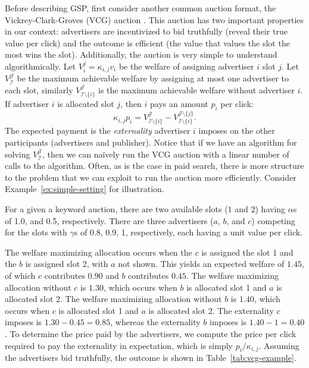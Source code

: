 \documentclass[prodmode,acmtist]{acmsmall} %
\begin{document}
Before describing GSP, first consider another common auction format, the Vickrey-Clark-Groves (VCG) auction \cite{Vickrey:1961ys}.
This auction has two important properties in our context: advertisers are incentivized to bid truthfully (reveal their true value per click) and the outcome is efficient (the value that values the slot the most wins the slot).
Additionally, the auction is very simple to understand algorithmically.
Let $V_i^j = \kappa_{i,j} v_i$ be the welfare of assigning advertiser $i$ slot $j$.
Let $V_\mathcal{I}^\mathcal{J}$ be the maximum achievable welfare by assigning at most one advertiser to each slot, similarly $V_{\mathcal{I}\setminus \{i\}}^\mathcal{J}$ is the maximum achievable welfare without advertiser $i$.
If advertiser $i$ is allocated slot $j$, then $i$ pays an amount $p_i$ per click:
\begin{equation}
\kappa_{i,j} p_{i} = V_{\mathcal{I}\setminus \{i\}}^\mathcal{J} - V_{\mathcal{I}\setminus \{i\}}^{\mathcal{J}\setminus \{j\}}.
\label{eqn:vcg-price}
\end{equation}
The expected payment is the \emph{externality} advertiser $i$ imposes on the other participants (advertisers and publisher).
Notice that if we have an algorithm for solving $V_\mathcal{I}^\mathcal{J}$, then we can na\"{i}vely run the VCG auction with a linear number of calls to the algorithm.
Often, as is the case in paid search, there is more structure to the problem that we can exploit to run the auction more efficiently.
Consider Example~\ref{ex:simple-setting} for illustration.

\begin{example}
For a given a keyword auction, there are two available slots ($1$ and $2$) having $\alpha$s of 1.0, and 0.5, respectively.  
There are three advertisers ($a$, $b$, and $c$) competing for the slots with $\gamma$s of 0.8, 0.9, 1, respectively, each having a unit value per click.
\label{ex:simple-setting} 
\end{example}

The welfare maximizing allocation occurs when the $c$ is assigned the slot 1 and the $b$ is assigned slot 2, with $a$ not shown.  
This yields an expected welfare of $1.45$, of which $c$ contributes $0.90$ and $b$ contributes $0.45$.
The welfare maximizing allocation without $c$ is $1.30$, which occurs when $b$ is allocated slot 1 and $a$ is allocated slot 2.
The welfare maximizing allocation without $b$ is $1.40$, which occurs when $c$ is allocated slot 1 and $a$ is allocated slot 2.
The externality $c$ imposes is $1.30 - 0.45 = 0.85$, whereas the externality $b$ imposes is $1.40 - 1 = 0.40$.
To determine the price paid by the advertisers, we compute the price per click required to pay the externality in expectation, which is simply $p_i / \kappa_{i,j}$.
Assuming the advertisers bid truthfully, the outcome is shown in Table~\ref{tab:vcg-example}.
\end{document}
